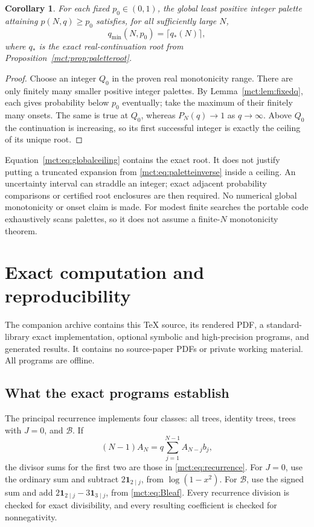 \documentclass[11pt]{article}
\newtheorem{corollary}[theorem]{Corollary}
\theoremstyle{definition}
\newcommand{\classB}{\mathcal B}
\begin{document}
\begin{corollary}\label{mct:cor:globalpalette}
For each fixed $p_0\in(0,1)$, the global least positive integer palette attaining $p(N,q)\ge p_0$ satisfies, for all sufficiently large $N$,
\begin{equation}\label{mct:eq:globalceiling}
 q_{\min}(N,p_0)=\lceil q_*(N)\rceil,
\end{equation}
where $q_*$ is the exact real-continuation root from Proposition~\ref{mct:prop:paletteroot}.
\end{corollary}
\begin{proof}
Choose an integer $Q_0$ in the proven real monotonicity range. There are only finitely many smaller positive integer palettes. By Lemma~\ref{mct:lem:fixedq}, each gives probability below $p_0$ eventually; take the maximum of their finitely many onsets. The same is true at $Q_0$, whereas $P_N(q)\to1$ as $q\to\infty$. Above $Q_0$ the continuation is increasing, so its first successful integer is exactly the ceiling of its unique root.
\end{proof}
Equation~\eqref{mct:eq:globalceiling} contains the exact root. It does not justify putting a truncated expansion from \eqref{mct:eq:paletteinverse} inside a ceiling. An uncertainty interval can straddle an integer; exact adjacent probability comparisons or certified root enclosures are then required. No numerical global monotonicity or onset claim is made. For modest finite searches the portable code exhaustively scans palettes, so it does not assume a finite-$N$ monotonicity theorem.

\section{Exact computation and reproducibility}\label{mct:sec:compute}
The companion archive contains this TeX source, its rendered PDF, a standard-library exact implementation, optional symbolic and high-precision programs, and generated results. It contains no source-paper PDFs or private working material. All programs are offline.

\subsection{What the exact programs establish}
The principal recurrence implements four classes: all trees, identity trees, trees with $J=0$, and $\classB$. If
\[
 (N-1)A_N=q\sum_{j=1}^{N-1}A_{N-j}b_j,
\]
the divisor sums for the first two are those in \eqref{mct:eq:recurrence}. For $J=0$, use the ordinary sum and subtract $2\mathbf1_{2\mid j}$, from $\log(1-x^2)$. For $\classB$, use the signed sum and add
$2\mathbf1_{2\mid j}-3\mathbf1_{3\mid j}$, from \eqref{mct:eq:Bleaf}. Every recurrence division is checked for exact divisibility, and every resulting coefficient is checked for nonnegativity.
\end{document}

